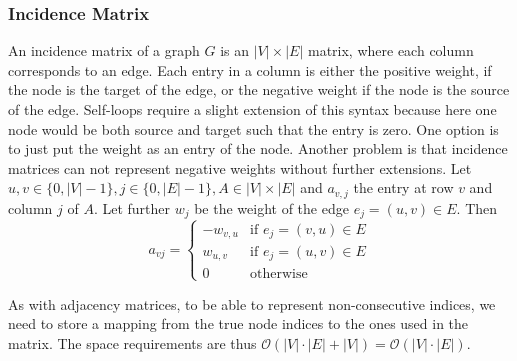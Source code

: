        \subsubsection*{Incidence Matrix}
            An incidence matrix of a graph $G$ is an $|V| \times |E|$ matrix, where each column corresponds to an edge. 
            Each entry in a column is either the positive weight, if the node is the target of the edge, or the negative weight if the node is the source of the edge. Self-loops require a slight extension of this syntax because here one node would be both source and target such that the entry is zero. One option is to just put the weight as an entry of the node.  Another problem is that incidence matrices can not represent negative weights without further extensions.        
            Let $u,v \in \{0, |V|-1\}, j \in \{0, |E|-1\}, A \in |V| \times |E|$ and $a_{v,j}$ the entry at row $v$ and column $j$ of $A$. Let further $w_j$ be the weight of the edge $e_j = (u,v) \in E$. Then 
            \[         a_{vj} = \begin{cases}
                        -w_{v,u} & \text{if } e_j = (v,u) \in E \\
                        w_{u,v} & \text{if } e_j = (u,v) \in E \\
                        0 & \text{otherwise}
                        \end{cases}
            \]
            
            As with adjacency matrices, to be able to represent non-consecutive indices, we need to store a mapping from the true node indices to the ones used in the matrix.
            The space requirements are thus $\mathcal{O}(|V| \cdot |E| + |V|) = \mathcal{O}(|V| \cdot |E|)$.
            
